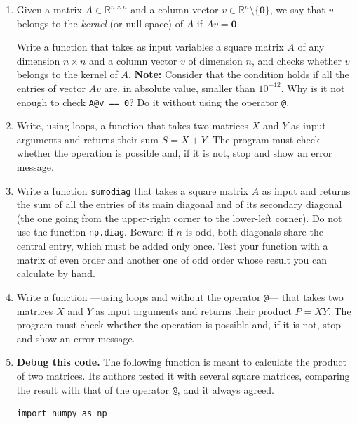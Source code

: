 \begin{enumerate}
\item Given a matrix $A \in \mathbb{R}^{n\times n}$ and a column vector $v \in \mathbb{R}^n\setminus\{\mathbf{0}\}$, we say that $v$ belongs to the \emph{kernel} (or null space) of $A$ if $Av =\mathbf{0}$.

Write a function that takes as input variables a square matrix $A$ of any dimension $n\times n$ and a column vector $v$ of dimension $n$, and checks whether $v$ belongs to the kernel of $A$. \textbf{Note:} Consider that the condition holds if all the entries of vector $Av$ are, in absolute value, smaller than $10^{-12}$. Why is it not enough to check \texttt{A@v == 0}? Do it without using the operator \texttt{@}.

\item Write, using loops, a function that takes two matrices $X$ and $Y$ as input arguments and returns their sum $S=X+Y$. The program must check whether the operation is possible and, if it is not, stop and show an error message.

\item Write a function \texttt{sumodiag} that takes a square matrix $A$ as input and returns the sum of all the entries of its main diagonal and of its secondary diagonal (the one going from the upper-right corner to the lower-left corner). Do not use the function \texttt{np.diag}. Beware: if $n$ is odd, both diagonals share the central entry, which must be added only once. Test your function with a matrix of even order and another one of odd order whose result you can calculate by hand.

\item Write a function ---using loops and without the operator \texttt{@}--- that takes two matrices $X$ and $Y$ as input arguments and returns their product $P=XY$. The program must check whether the operation is possible and, if it is not, stop and show an error message.

\item \textbf{Debug this code.} The following function is meant to calculate the product of two matrices. Its authors tested it with several square matrices, comparing the result with that of the operator \texttt{@}, and it always agreed.
\begin{verbatim}
import numpy as np


\end{verbatim}
\end{enumerate}
